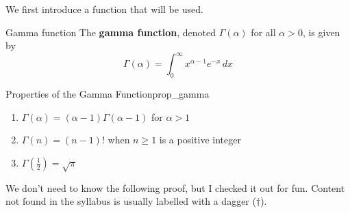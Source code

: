 We first introduce a function that will be used.

\begin{Definition}{Gamma function}{}
    The \textbf{gamma function},
    denoted $ \Gamma(\alpha) $ for all $ \alpha>0 $, is given by
    \[ \Gamma(\alpha)=\int_{0}^{\infty} x^{\alpha-1}e^{-x}\, d{x}  \]
\end{Definition}
\begin{Proposition}{Properties of the Gamma Function}{prop_gamma}
    \begin{enumerate}[label=(\arabic*)]
        \item\label{gamma_prop_1}$ \Gamma(\alpha)=(\alpha-1)\Gamma(\alpha-1) $ for $ \alpha>1 $
        \item\label{gamma_prop_2} $ \Gamma(n)=(n-1)! $ when $ n\ge 1 $ is a positive integer
        \item\label{gamma_prop_3} $ \displaystyle \Gamma\left( \frac{1}{2} \right)=\sqrt{\pi} $
    \end{enumerate}
\end{Proposition}
We don't need to know the following proof, but I checked it out for fun. Content not found in the
syllabus is usually labelled with a dagger ($ \dagger $).
